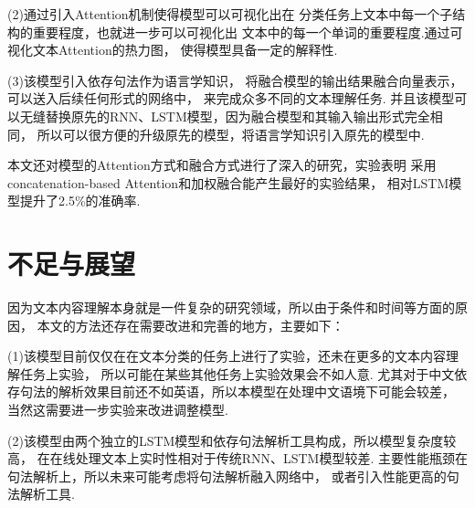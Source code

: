 \documentclass[bachelor,adobefonts]{jnuthesis}
\begin{document}
(2)通过引入Attention机制使得模型可以可视化出在
分类任务上文本中每一个子结构的重要程度，也就进一步可以可视化出
文本中的每一个单词的重要程度.通过可视化文本Attention的热力图，
使得模型具备一定的解释性.

(3)该模型引入依存句法作为语言学知识，
将融合模型的输出结果融合向量表示，可以送入后续任何形式的网络中，
来完成众多不同的文本理解任务.
并且该模型可以无缝替换原先的RNN、LSTM模型，因为融合模型和其输入输出形式完全相同，
所以可以很方便的升级原先的模型，将语言学知识引入原先的模型中.

本文还对模型的Attention方式和融合方式进行了深入的研究，实验表明
采用concatenation-based Attention和加权融合能产生最好的实验结果，
相对LSTM模型提升了2.5\%的准确率.

\section{不足与展望}
因为文本内容理解本身就是一件复杂的研究领域，所以由于条件和时间等方面的原因，
本文的方法还存在需要改进和完善的地方，主要如下：

(1)该模型目前仅仅在在文本分类的任务上进行了实验，还未在更多的文本内容理解任务上实验，
所以可能在某些其他任务上实验效果会不如人意.
尤其对于中文依存句法的解析效果目前还不如英语，所以本模型在处理中文语境下可能会较差，
当然这需要进一步实验来改进调整模型.

(2)该模型由两个独立的LSTM模型和依存句法解析工具构成，所以模型复杂度较高，
在在线处理文本上实时性相对于传统RNN、LSTM模型较差.
主要性能瓶颈在句法解析上，所以未来可能考虑将句法解析融入网络中，
或者引入性能更高的句法解析工具.


\nocite{*}

%
%
\end{document}
